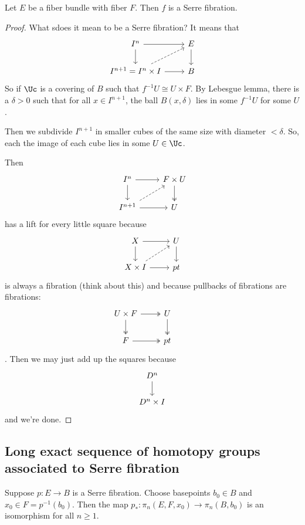 \begin{remark}
\begin{defn}
\begin{prop}[Hatcher, 4.48]
	Let $E$ be a fiber bundle with fiber $F$. Then $f$ is a Serre fibration.
\end{prop}
\begin{proof}
	What sdoes it mean to be a Serre fibration? It means that
	\[\begin{tikzcd}
		I^n\arrow[r]\arrow[d]&E\arrow[d]\\
		I^{n+1}=I^n\times I\arrow[r]\arrow[ur,dashed]&B
	\end{tikzcd}\]
	So if $\Uc$ is a covering of $B$ such that $f^{-1}U\cong U\times F$. By Lebesgue lemma, there is a $\delta>0$ such that for all $x\in I^{n+1}$, the ball $B(x,\delta)$ lies in some $f^{-1}U$ for some $U$.
	
	Then we subdivide $I^{n+1}$ in smaller cubes of the same size with diameter $<\delta$. So, each the image of each cube lies in some $U\in\Uc$.
	
	Then
	\[\begin{tikzcd}
		I^n\arrow[d]\arrow[r]&F\times U\arrow[d,two heads]\\
		I^{n+1}\arrow[r]\arrow[ur,dashed]&U
	\end{tikzcd}\]
	has a lift for every little square because
	\[\begin{tikzcd}
		X\arrow[r]\arrow[d]&U\arrow[d]\\
		X\times I\arrow[r]\arrow[ur,dashed]&pt
	\end{tikzcd}\]
	is always a fibration {\color{orange}(think about this)} and because pullbacks of fibrations are fibrations:
	\[\begin{tikzcd}
		U\times F\arrow[r,two heads]\arrow[d,two heads]&U\arrow[d,two heads]&\\
		F\arrow[r,two heads]&pt
	\end{tikzcd}\].
	Then we may just add up the squares because
	\[\begin{tikzcd}
		D^n\arrow[d]\\
		D^n\times I
	\end{tikzcd}\]
	and we're done.
\end{proof}

\subsection{Long exact sequence of homotopy groups associated to Serre fibration}
\begin{thm}[Hatcher 4.41]
	Suppose $p:E\to B$ is a Serre fibration. Choose basepoints $b_{0}\in B$ and $x_{0}\in F=p^{-1}(b_{0})$. Then the map $p_{*}:\pi_{n}(E,F,x_{0})\to \pi_{n}(B,b_{0})$ is an isomorphism for all $n\geq 1$.


\end{thm}
\end{defn}
\end{remark}
